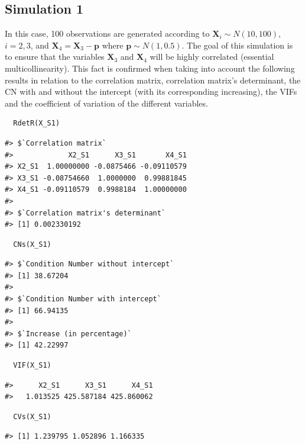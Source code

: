 \hypertarget{simulation-1}{%
\subsection{Simulation 1}\label{simulation-1}}

In this case, 100 observations are generated according to \(\mathbf{X}_{i} \sim N(10, 100)\), \(i=2,3\), and \(\mathbf{X}_{4} = \mathbf{X}_{3} - \mathbf{p}\) where \(\mathbf{p} \sim N(1, 0.5)\). The goal of this simulation is to ensure that the variables \(\mathbf{X}_{3}\) and \(\mathbf{X}_{4}\) will be highly correlated (essential multicollinearity). This fact is confirmed when taking into account the following results in relation to the correlation matrix, correlation matrix's determinant, the CN with and without the intercept (with its corresponding increasing), the VIFs and the coefficient of variation of the different variables.

\begin{verbatim}
  RdetR(X_S1)
\end{verbatim}

\begin{verbatim}
#> $`Correlation matrix`
#>             X2_S1      X3_S1       X4_S1
#> X2_S1  1.00000000 -0.0875466 -0.09110579
#> X3_S1 -0.08754660  1.0000000  0.99881845
#> X4_S1 -0.09110579  0.9988184  1.00000000
#> 
#> $`Correlation matrix's determinant`
#> [1] 0.002330192
\end{verbatim}

\begin{verbatim}
  CNs(X_S1)
\end{verbatim}

\begin{verbatim}
#> $`Condition Number without intercept`
#> [1] 38.67204
#> 
#> $`Condition Number with intercept`
#> [1] 66.94135
#> 
#> $`Increase (in percentage)`
#> [1] 42.22997
\end{verbatim}

\begin{verbatim}
  VIF(X_S1)
\end{verbatim}

\begin{verbatim}
#>      X2_S1      X3_S1      X4_S1 
#>   1.013525 425.587184 425.860062
\end{verbatim}

\begin{verbatim}
  CVs(X_S1)
\end{verbatim}

\begin{verbatim}
#> [1] 1.239795 1.052896 1.166335
\end{verbatim}

